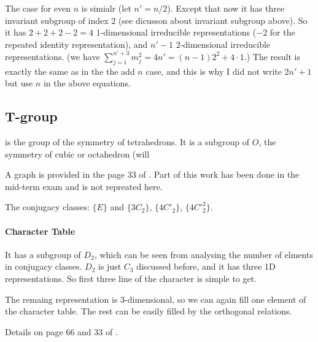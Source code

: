 The case for even $n$ is simialr (let $n'=n/2$). Except that now it
has three invariant subgroup of index $2$ (see dicusson about invariant
subgroup above). So it has $2+2+2-2=4$ $1$-dimensional irreducible
representations ($-2$ for the repeated identity representation), and
$n'-1$ $2$-dimensional irreducible representations.
(we have $\sum_{j=1}^{n'+3}m_j^2 = 4n' = (n-1)2^2 + 4\cdot 1$.)
The result is exactly the same as in the the add $n$ case, and this is
why I did not write $2n'+1$ but use $n$ in the above equations.


\subsection{T-group}

 is the group of the symmetry of tetrahedrons. It is
a subgroup of $O$, the symmetry of cubic or octahedron (will %

A graph is provided in the page 33 of \cite{book}.  Part of this work
has been done in the mid-term exam and is not repreated here.

The conjugacy classes:
$\{E\}$ and $\{3C_2\}$, $\{4C'_2\}$, $\{4C'^2_2\}$.

\paragraph{Character Table}
It has a subgroup of $D_2$, which can be seen from analysing the
number of elments in conjugacy classes. $D_2$ is just $C_3$ discussed
before, and it has three 1D representations. So first three line of
the character is simple to get.

The remaing representation is $3$-dimensional, so we can again fill
one element of the character table. The rest can be easily filled by
the orthogonal relations.

Details on page 66 and 33 of \cite{book}.
